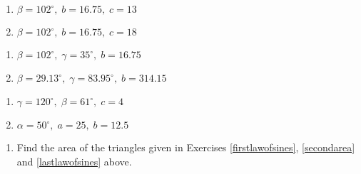 \documentclass{ximera}
\begin{document}
\begin{multicols}{2} 

\begin{enumerate}

\setcounter{enumi}{\value{HW}}

\item $\beta = 102^{\circ}, \; b = 16.75, \; c = 13$
\item $\beta = 102^{\circ}, \; b = 16.75, \; c = 18$

\setcounter{HW}{\value{enumi}}

\end{enumerate}

\end{multicols}

\begin{multicols}{2} 

\begin{enumerate}

\setcounter{enumi}{\value{HW}}

\item $\beta = 102^{\circ}, \; \gamma = 35^{\circ}, \; b = 16.75$
\item $\beta = 29.13^{\circ}, \; \gamma = 83.95^{\circ}, \; b = 314.15$

\setcounter{HW}{\value{enumi}}

\end{enumerate}

\end{multicols}

\begin{multicols}{2} 

\begin{enumerate}

\setcounter{enumi}{\value{HW}}

\item $\gamma = 120^{\circ}, \; \beta = 61^{\circ}, \; c = 4$
\item $\alpha = 50^{\circ}, \; a = 25, \; b = 12.5$ \label{lastlawofsines}

\setcounter{HW}{\value{enumi}}

\end{enumerate}

\end{multicols}

\begin{enumerate}

\setcounter{enumi}{\value{HW}}


\item Find the area of the triangles given in Exercises \ref{firstlawofsines}, \ref{secondarea} and \ref{lastlawofsines} above.

\setcounter{HW}{\value{enumi}}

\end{enumerate}
\end{document}
